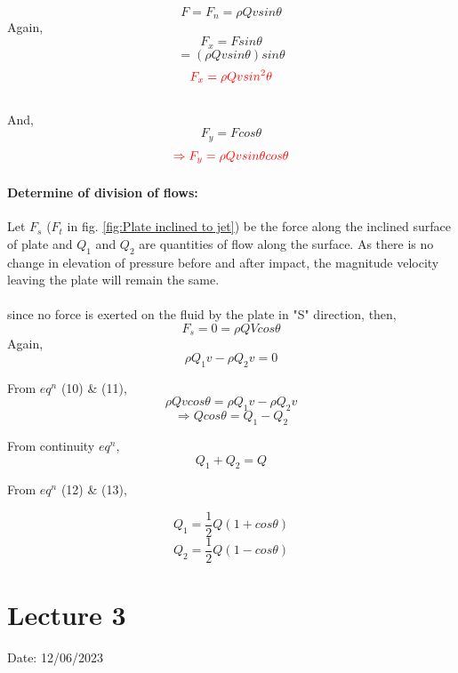 \documentclass{article}
\begin{document}
$$F = F_n = \rho Q v sin\theta $$
Again, $$F_x = F sin\theta$$
$$= (\rho Q v sin \theta) sin \theta $$
\begin{equation}
	\textcolor{red}{F_x = \rho Q v sin^2 \theta} \label{eq:eq8}
\end{equation}
\\
And, $$F_y = F cos\theta$$
\begin{equation}
	\textcolor{red}{\Rightarrow F_y = \rho Q v sin\theta cos\theta} \label{eq:eq9}
\end{equation}
\vspace{0.25cm}
\paragraph*{Determine of division of flows:}
Let $F_s$ ($F_t$ in fig. \ref{fig:Plate inclined to jet}) be the force along the inclined surface of plate and $Q_1$ and $Q_2$ are quantities of flow along the surface. As there is no change in elevation of pressure before and after impact, the magnitude velocity leaving the plate will remain the same. \\
\\
since no force is exerted on the fluid by the plate in "S" direction, then,
\begin{equation}
	F_s = 0 = \rho Q V cos\theta \label{eq:eq10}
\end{equation}
Again, 
\begin{equation}
	\rho Q_1 v - \rho Q_2 v = 0 \label{eq:eq11}
\end{equation}

From $eq^n$ (10) \& (11),
$$\rho Q v cos\theta = \rho Q_1 v - \rho Q_2 v $$
\begin{equation}
	\Rightarrow Q cos\theta = Q_1 - Q_2 \label{eq:eq12}
\end{equation}

From continuity $eq^n$, 
\begin{equation}
	Q_1 + Q_2 = Q \label{eq:eq13}
\end{equation}

From $eq^n$ (12) \& (13),


$$Q_1 = \frac{1}{2} Q (1+cos\theta)$$ 
  \begin{equation}
     Q_2 = \frac{1}{2} Q (1-cos\theta) \label{eq:eq14} 
  \end{equation}

\pagebreak

\section{Lecture 3}
\hfill Date: 12/06/2023
\end{document}
